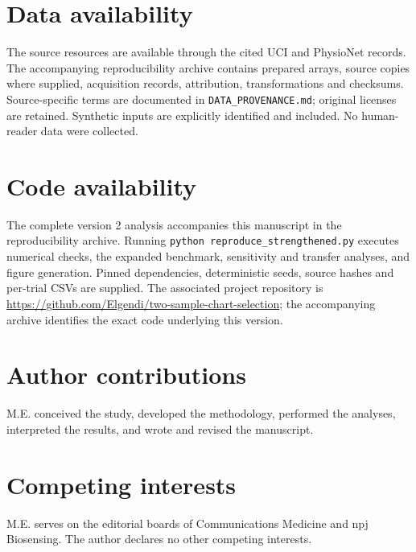 \documentclass[11pt]{article}
\begin{document}
\section*{Data availability}
The source resources are available through the cited UCI and PhysioNet records. The accompanying reproducibility archive contains prepared arrays, source copies where supplied, acquisition records, attribution, transformations and checksums. Source-specific terms are documented in \texttt{DATA\_PROVENANCE.md}; original licenses are retained. Synthetic inputs are explicitly identified and included. No human-reader data were collected.

\section*{Code availability}
The complete version 2 analysis accompanies this manuscript in the reproducibility archive. Running \texttt{python reproduce\_strengthened.py} executes numerical checks, the expanded benchmark, sensitivity and transfer analyses, and figure generation. Pinned dependencies, deterministic seeds, source hashes and per-trial CSVs are supplied. The associated project repository is \url{https://github.com/Elgendi/two-sample-chart-selection}; the accompanying archive identifies the exact code underlying this version.

\section*{Author contributions}
M.E. conceived the study, developed the methodology, performed the analyses, interpreted the results, and wrote and revised the manuscript.
\section*{Competing interests}
M.E. serves on the editorial boards of Communications Medicine and npj Biosensing. The author declares no other competing interests.
\begingroup\scriptsize\setlength{\bibsep}{0pt}\endgroup
\end{document}
